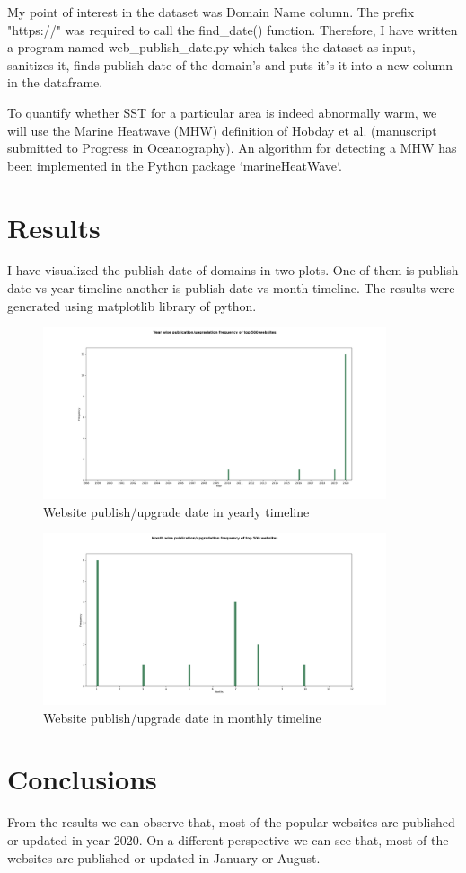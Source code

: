 \documentclass[12pt, letterpaper]{article}
\begin{document}
My point of interest in the dataset was Domain Name column. The prefix "https://" was required to call the find\_date() function. Therefore, I have written a program named web\_publish\_date.py which takes the dataset as input, sanitizes it, finds publish date of the domain's and puts it's it into a new column in the dataframe.


To quantify whether SST for a particular area is indeed abnormally warm, we will use the Marine Heatwave (MHW) definition of Hobday et al. (manuscript submitted to Progress in Oceanography).  An algorithm for detecting a MHW has been implemented in the Python package `marineHeatWave`.

\section{Results}

I have visualized the publish date of domains in two plots. One of them is publish date vs year timeline another is publish date vs month timeline. The results were generated using matplotlib library of python.


\begin{figure}
\includegraphics[width=0.9\textwidth]{Plot1.png}
\caption{Website publish/upgrade date in yearly timeline}
\label{fig:plot1}
\end{figure}

\begin{figure}
\includegraphics[width=0.9\textwidth]{Plot2.png}
\caption{Website publish/upgrade date in monthly timeline}
\label{fig:plot2}
\end{figure}



\section{Conclusions}
From the results we can observe that, most of the popular websites are published or updated in year 2020. On a different perspective we can see that, most of the websites are published or updated in January or August.

\end{document}
